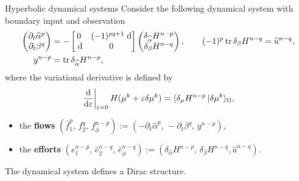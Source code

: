 \documentclass[aspectratio=169]{beamer}
\DeclareMathOperator{\tr}{tr}
\newcommand{\dualpr}[3][]{\ensuremath{\langle #2 \, \vert #3 \rangle_{#1}}}
\newcommand*{\dual}[1]{\ensuremath{\widehat{#1}}}
\begin{document}
	\begin{frame}{Hyperbolic dynamical systems}
		Consider the following dynamical system with boundary input and observation
		\begin{equation*}
			\begin{aligned}
				\begin{pmatrix}
					\partial_t \dual{\alpha}^p \\
					\partial_t \beta^q\\
				\end{pmatrix} &= 
				-\begin{bmatrix}
					0 & (-1)^{pq+1}\d \\
					\d & 0 \\
				\end{bmatrix}
				\begin{pmatrix}
					\delta_{\dual{\alpha}} H^{n-p}\\
					\delta_{\beta} H^{n-q}\\
				\end{pmatrix}, \qquad (-1)^p\tr \delta_{\beta} H^{n-q} = \dual{u}^{n-q}, \\
				y^{n-p} &= \tr \delta_{\dual{\alpha}} H^{n-p}, 
			\end{aligned}	
		\end{equation*}
		where the variational derivative is defined by
		\begin{equation*}
			\begin{aligned}
				\left.\diff{}{\varepsilon}\right|_{\varepsilon = 0} H({\mu}^k + \varepsilon \delta {\mu}^k) = \dualpr[\Omega]{\delta_{\mu} H^{n-p}}{\delta {\mu}^k},
			\end{aligned}
		\end{equation*}
		\begin{itemize}
			\item
			the \textbf{flows} $(\dual{f}_1^p,\, f_2^q,\, {f}_{\partial}^{n-p}) := (-\partial_t \dual{\alpha}^p,\,  -\partial_t \beta^q, \, {y}^{n-p}),$
			\item
			the \textbf{efforts} $(e_1^{n-p}, \, \dual{e}_2^{n-q}, \, \dual{e}_{\partial}^{n-q}) := ( \delta_{\dual{\alpha}} H^{n-p}, \,  \delta_{\beta} H^{n-q}, \dual{u}^{n-q}).$
		\end{itemize}
		The dynamical system defines a Dirac structure.
		
	\end{frame}
	
\end{document}
